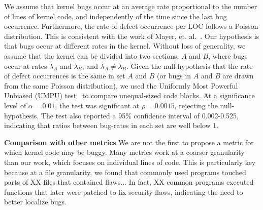 We assume that kernel bugs occur at an average rate proportional to the
number of lines of kernel code, and independently of the time since the last
bug occurrence. Furthermore, the rate of defect occurrence per LOC
follows a Poisson distribution.
This is consistent with the work of Mayer, et. al.~\cite{mayer1989probability}.
Our hypothesis is that bugs occur at different rates in the kernel. Without
loss of generality, we assume that the kernel can be divided into two sections,
$A$ and $B$, where bugs occur at rates $\lambda_A$ and
$\lambda_B$, and $\lambda_A \neq \lambda_B$. Given the null-hypothesis
that the rate of defect occurrences is the same in set $A$ and $B$
(or bugs in $A$ and $B$ are drawn from the same Poisson distribution),
we used the Uniformly Most Powerful Unbiased (UMPU) test~\cite{shiue1982experiment}
to compare unequal-sized code blocks.
At a significance level of $\alpha=0.01$, the test was significant at
$\rho=0.0015$, rejecting the null-hypothesis.
The test also reported a 95\% confidence interval of
0.002-0.525, indicating that ratios between bug-rates in each set are well
below 1. 

\textbf{Comparison with other metrics}
We are not the first to propose a metric for which kernel code may be buggy.
Many metrics work at a coarser granularity than our work, which focuses on
individual lines of code.  This is particularly key because at a file
granularity, we found that commonly used programs touched parts of
XX files that contained flaws...  In fact, XX common
programs executed functions that later were patched to fix security
flaws, indicating the need to better localize bugs.

